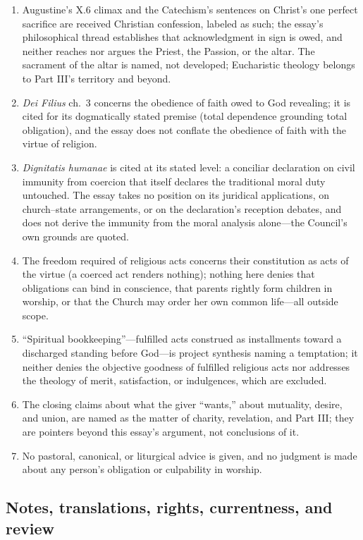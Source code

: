 \begin{enumerate}[leftmargin=1.45em,itemsep=0.25em]
\item Augustine's X.6 climax and the Catechism's sentences on Christ's one perfect sacrifice are received Christian confession, labeled as such; the essay's philosophical thread establishes that acknowledgment in sign is owed, and neither reaches nor argues the Priest, the Passion, or the altar. The sacrament of the altar is named, not developed; Eucharistic theology belongs to Part III's territory and beyond.
\item \emph{Dei Filius} ch.~3 concerns the obedience of faith owed to God revealing; it is cited for its dogmatically stated premise (total dependence grounding total obligation), and the essay does not conflate the obedience of faith with the virtue of religion.
\item \emph{Dignitatis humanae} is cited at its stated level: a conciliar declaration on civil immunity from coercion that itself declares the traditional moral duty untouched. The essay takes no position on its juridical applications, on church--state arrangements, or on the declaration's reception debates, and does not derive the immunity from the moral analysis alone---the Council's own grounds are quoted.
\item The freedom required of religious acts concerns their constitution as acts of the virtue (a coerced act renders nothing); nothing here denies that obligations can bind in conscience, that parents rightly form children in worship, or that the Church may order her own common life---all outside scope.
\item ``Spiritual bookkeeping''---fulfilled acts construed as installments toward a discharged standing before God---is project synthesis naming a temptation; it neither denies the objective goodness of fulfilled religious acts nor addresses the theology of merit, satisfaction, or indulgences, which are excluded.
\item The closing claims about what the giver ``wants,'' about mutuality, desire, and union, are named as the matter of charity, revelation, and Part III; they are pointers beyond this essay's argument, not conclusions of it.
\item No pastoral, canonical, or liturgical advice is given, and no judgment is made about any person's obligation or culpability in worship.
\end{enumerate}

\subsection{Notes, translations, rights, currentness, and review}

